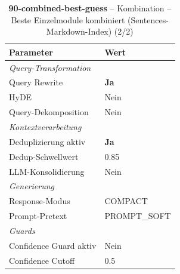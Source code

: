 \begin{table}[H]
\centering
\small
\setlength{\tabcolsep}{4pt}
\begin{tabular}{lp{8cm}}
\toprule
\textbf{Parameter} & \textbf{Wert} \\
\midrule
\multicolumn{2}{l}{\textit{Query-Transformation}} \\
\midrule
\quad Query Rewrite & \textbf{Ja} \\
\quad HyDE & Nein \\
\quad Query-Dekomposition & Nein \\
\midrule
\multicolumn{2}{l}{\textit{Kontextverarbeitung}} \\
\midrule
\quad Deduplizierung aktiv & \textbf{Ja} \\
\quad Dedup-Schwellwert & 0.85 \\
\quad LLM-Konsolidierung & Nein \\
\midrule
\multicolumn{2}{l}{\textit{Generierung}} \\
\midrule
\quad Response-Modus & COMPACT \\
\quad Prompt-Pretext & PROMPT\_SOFT \\
\midrule
\multicolumn{2}{l}{\textit{Guards}} \\
\midrule
\quad Confidence Guard aktiv & Nein \\
\quad Confidence Cutoff & 0.5 \\
\bottomrule
\end{tabular}
\caption{\textbf{90-combined-best-guess} -- Kombination -- Beste Einzelmodule kombiniert (Sentences-Markdown-Index) (2/2)}
\label{tab:config_90_combined_best_guess_b}
\end{table}
